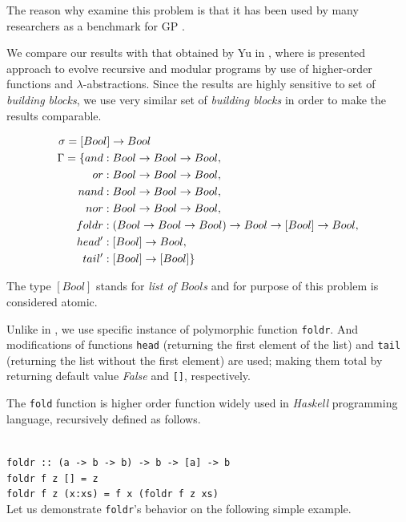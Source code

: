 \documentclass[12pt,a4paper]{report}
\newcommand{\Lets}{Let us\xspace}
\begin{document}
The reason why examine this problem is that it has been used by many researchers
as a benchmark for GP \cite{todo,yu01}.

We compare our results with that obtained by Yu in \cite{yu01},
where is presented approach to evolve recursive and modular programs
by use of higher-order functions and $\lambda$-abstractions.
Since the results are highly sensitive to set of \textit{building blocks}, 
we use very similar set of \textit{building blocks} in order to make 
the results comparable. 

\begin{align*}
\sigma = [Boo&l] \rightarrow Bool\\
\Gamma = \{
  and   &: Bool \rightarrow Bool \rightarrow Bool                              ,\\
  or    &: Bool \rightarrow Bool \rightarrow Bool                              ,\\
  nand  &: Bool \rightarrow Bool \rightarrow Bool                              ,\\
  nor   &: Bool \rightarrow Bool \rightarrow Bool                              ,\\
  foldr &: (Bool \rightarrow Bool \rightarrow Bool) \rightarrow Bool \rightarrow [Bool] \rightarrow Bool ,\\
  head' &: [Bool] \rightarrow Bool                                   ,\\
  tail' &: [Bool] \rightarrow [Bool]                              \}\\
\end{align*}

The type $[Bool]$ stands for \textit{list of $Bool$s} and for purpose of
this problem is considered atomic.

Unlike in \cite{yu01}, we use specific instance of polymorphic 
function \texttt{foldr}. 
And modifications of functions \texttt{head} 
(returning the first element of the list) 
and \texttt{tail} (returning the list without the first element) are used; 
making them total by returning default value \textit{False}
and \texttt{[]}, respectively.

The \texttt{fold} function is higher order function widely used in \textit{Haskell}
programming language, recursively defined as follows.

\texttt{~\\
foldr :: (a -> b -> b) -> b -> [a] -> b \\
foldr f z []     = z \\
foldr f z (x:xs) = f x (foldr f z xs)  
}\\

\Lets demonstrate \texttt{foldr}'s behavior on the following simple example.
\end{document}
